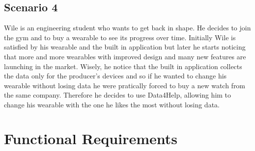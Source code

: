 \subsection{Scenario 4}
Wile is an engineering student who wants to get back in shape. He decides to join the gym and to buy a wearable to see its progress over time. Initially Wile is satisfied by his wearable and the built in application but later he starts noticing that more and more wearables with improved design and many new features are launching in the market. Wisely, he notice that the built in application collects the data only for the producer's devices and so if he wanted to change his wearable without losing data he were pratically forced to buy a new watch from the same company. Therefore he decides to use Data4Help, allowing him to change his wearable with the one he likes the most without losing data.

\section{Functional Requirements}

